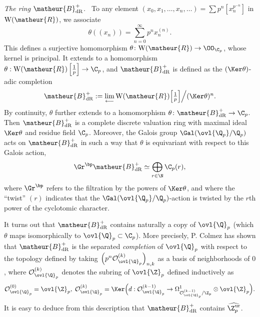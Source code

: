 \begin{para}
 {\itshape The ring $\matheur{B}^+_{\mathrm{dR}}$.\ }
 To any element 
 $(x_0,x_1,\ldots,x_n,\ldots)=\sum p^n[x^{p^{-n}}_n]$ in
 $\mathrm{W}(\matheur{R})$, we associate
 \begin{equation*}
 \theta((x_n))=\sum^{\infty}_{n=0}p^nx^{(n)}_n.
 \end{equation*}
 This defines a surjective homomorphism
 $\theta\colon\mathrm{W}(\matheur{R})\rightarrow \OO_{\C_p}$,
 whose kernel is principal.
 It extends to a homomorphism $\theta:
 \mathrm{W}(\matheur{R})\left[\frac{1}{p}\right]\rightarrow\C_p$,
 and $\matheur{B}^+_{\mathrm{dR}}$ is defined as the $(\Ker\theta)$-adic 
 completion
 \begin{equation*}
 \matheur{B}^+_{\mathrm{dR}} :=\lim_{\longleftarrow}
 \mathrm{W}(\matheur{R})\textstyle{\left[\frac{1}{p}\right]}
 \Big/(\Ker\theta)^n.
 \end{equation*}
 By continuity, $\theta$ further extends to a homomorphism $\theta\colon
 \matheur{B}^+_{\mathrm{dR}}\rightarrow\C_p$.
 Then $\matheur{B}^+_{\mathrm{dR}}$ is a complete discrete valuation
 ring with maximal ideal $\Ker\theta$ and residue field $\C_p$.
 Moreover, the Galois group $\Gal(\ovl{\Q_p}/\Q_p)$ acts on 
 $\matheur{B}^+_{\mathrm{dR}}$ in such a way that $\theta$ is equivariant 
 with respect to this Galois action,
 \begin{equation*}
  \Gr^{\bp}\matheur{B}^+_{\mathrm{dR}}\simeq \bigoplus_{r\in \N}\C_p(r),
 \end{equation*}
 where $\Gr^{\bp}$ refers to the filtration by the powers of
 $\Ker\theta$, and where the ``twist'' $(r)$ indicates that the 
 $\Gal(\ovl{\Q_p}/\Q_p)$-action is twisted by the $r$th power of the
 cyclotomic character.

 It turns out that $\matheur{B}^+_{\mathrm{dR}}$ contains naturally a copy of
 ${\ovl{\Q}}_p$ (which $\theta$ maps isomorphically to ${\ovl{\Q}}_p \subset
 \C_p$). More precisely, P. Colmez \cite{lnasddb} has shown that
 $\matheur{B}^+_{\mathrm{dR}}$ is the separated \emph{completion} of
 ${\ovl{\Q}}_p$ with respect to the topology defined by taking
 $\Bigl(p^n\mathcal{O}^{(k)}_{{\ovl{\Q}}_p}\Bigr)_{n,k}$ as a basis of
 neighborhoods of $0$, where $\mathcal{O}^{(k)}_{{\ovl{\Q}}_p}$ denotes
 the subring of ${\ovl{\Z}}_p$ defined inductively as
 \begin{equation*}
 \mathcal{O}^{(0)}_{{\ovl{\Q}}_p}
  ={\ovl{\Z}}_p,\;\mathcal{O}^{(k)}_{{\ovl{\Q}}_p}
  =\Ker\Bigl(d: \mathcal{O}^{(k-1)}_{{\ovl{\Q}}_p}
  \rightarrow
  \Omega^1_{\mathcal{O}^{(k-1)}_{{\ovl{\Q}}_p}/{\Z}_p}\otimes
  {\ovl{\Z}}_p\Bigr).
 \end{equation*}
 It is easy to deduce from this description that
 $\matheur{B}^+_{\mathrm{dR}}$ contains $\widehat{{\Z}_p^{\mathrm{ur}}}$.
\end{para}

